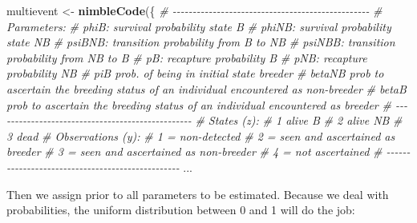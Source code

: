 \documentclass[
  12pt,
]{krantz}
\newenvironment{Shaded}{\begin{snugshade}}{\end{snugshade}}
\newcommand{\CommentTok}[1]{\textcolor[rgb]{0.56,0.35,0.01}{\textit{#1}}}
\newcommand{\FunctionTok}[1]{\textcolor[rgb]{0.13,0.29,0.53}{\textbf{#1}}}
\newcommand{\NormalTok}[1]{#1}
\newcommand{\OtherTok}[1]{\textcolor[rgb]{0.56,0.35,0.01}{#1}}
\begin{document}
\begin{Shaded}
\begin{Highlighting}[]
\NormalTok{multievent }\OtherTok{\textless{}{-}} \FunctionTok{nimbleCode}\NormalTok{(\{}
  \CommentTok{\# {-}{-}{-}{-}{-}{-}{-}{-}{-}{-}{-}{-}{-}{-}{-}{-}{-}{-}{-}{-}{-}{-}{-}{-}{-}{-}{-}{-}{-}{-}{-}{-}{-}{-}{-}{-}{-}{-}{-}{-}{-}{-}{-}{-}{-}{-}{-}{-}{-}}
  \CommentTok{\# Parameters:}
  \CommentTok{\# phiB: survival probability state B}
  \CommentTok{\# phiNB: survival probability state NB}
  \CommentTok{\# psiBNB: transition probability from B to NB}
  \CommentTok{\# psiNBB: transition probability from NB to B}
  \CommentTok{\# pB: recapture probability B}
  \CommentTok{\# pNB: recapture probability NB}
  \CommentTok{\# piB prob. of being in initial state breeder}
  \CommentTok{\# betaNB prob to ascertain the breeding status of an individual encountered as non{-}breeder}
  \CommentTok{\# betaB prob to ascertain the breeding status of an individual encountered as breeder}
  \CommentTok{\# {-}{-}{-}{-}{-}{-}{-}{-}{-}{-}{-}{-}{-}{-}{-}{-}{-}{-}{-}{-}{-}{-}{-}{-}{-}{-}{-}{-}{-}{-}{-}{-}{-}{-}{-}{-}{-}{-}{-}{-}{-}{-}{-}{-}{-}{-}{-}{-}{-}}
  \CommentTok{\# States (z):}
  \CommentTok{\# 1 alive B}
  \CommentTok{\# 2 alive NB}
  \CommentTok{\# 3 dead}
  \CommentTok{\# Observations (y):}
  \CommentTok{\# 1 = non{-}detected}
  \CommentTok{\# 2 = seen and ascertained as breeder}
  \CommentTok{\# 3 = seen and ascertained as non{-}breeder}
  \CommentTok{\# 4 = not ascertained}
  \CommentTok{\# {-}{-}{-}{-}{-}{-}{-}{-}{-}{-}{-}{-}{-}{-}{-}{-}{-}{-}{-}{-}{-}{-}{-}{-}{-}{-}{-}{-}{-}{-}{-}{-}{-}{-}{-}{-}{-}{-}{-}{-}{-}{-}{-}{-}{-}{-}{-}{-}{-}}
\NormalTok{...}
\end{Highlighting}
\end{Shaded}

Then we assign prior to all parameters to be estimated. Because we deal with probabilities, the uniform distribution between 0 and 1 will do the job:
\end{document}
